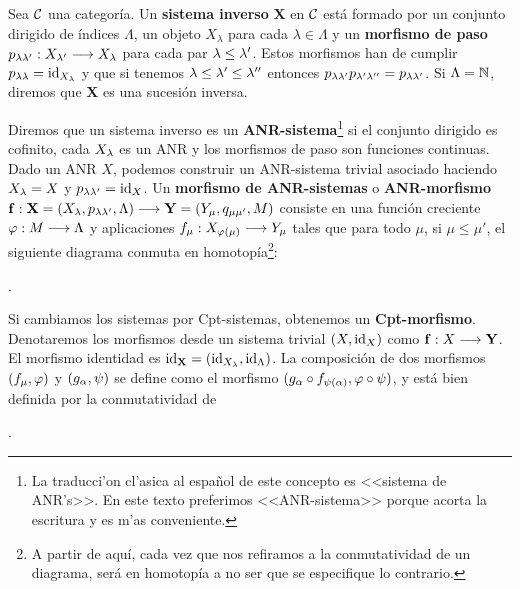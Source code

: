\begin{definition}
  Sea $ \mathcal{C}  $ una categoría. Un \textbf{sistema inverso} $ \mathbf{X } $ en $ \mathcal{C}  $ está formado por un conjunto dirigido de índices $ \Lambda  $, un objeto $ X_\lambda  $ para cada $ \lambda \in \Lambda  $ y un \textbf{morfismo de paso} $ p_{\lambda \lambda' } : X_{\lambda'} \longrightarrow X_\lambda $ para cada par $ \lambda\leq \lambda'  $. Estos morfismos han de cumplir $ p_{\lambda \lambda }  = \operatorname{id}_{X_\lambda } $ y que si tenemos $ \lambda\leq \lambda' \leq \lambda''  $ entonces $ p_{\lambda \lambda'}p_{\lambda'\lambda ''} = p_{\lambda \lambda' } $. Si $ \Lambda  = \mathbb{N}  $, diremos que $ \mathbf{X } $ es una sucesión inversa.
\end{definition}

Diremos que un sistema inverso es un \textbf{ANR-sistema}\footnote{La traducci'on cl'asica al espa\~nol de este concepto es <<sistema de ANR's>>. En este texto preferimos <<ANR-sistema>> porque acorta la escritura y es m'as conveniente.} si el conjunto dirigido es cofinito, cada $ X_\lambda  $ es un ANR y los morfismos de paso son funciones continuas. Dado un ANR $ X  $, podemos construir un ANR-sistema trivial asociado haciendo $ X_\lambda = X  $ y $ p_{\lambda\lambda'} = \operatorname{id}_X  $. Un \textbf{morfismo de ANR-sistemas} o \textbf{ANR-morfismo} $ \mathbf{f}:\mathbf{X} = (X_\lambda,p_{\lambda\lambda'},\Lambda)\longrightarrow \mathbf{Y} = (Y_\mu,q_{\mu\mu'},M )  $ consiste en una función creciente $ \varphi:M \longrightarrow \Lambda  $ y aplicaciones $ f_\mu :X_{\varphi(\mu)}\longrightarrow Y_\mu  $ tales que para todo $ \mu $, si $ \mu\leq \mu'  $, el siguiente diagrama conmuta en homotopía\footnote{A partir de aquí, cada vez que nos refiramos a la conmutatividad de un diagrama, será en homotopía a no ser que se especifique lo contrario.}:
\begin{center}
  .
\end{center}
 Si cambiamos los sistemas por Cpt-sistemas, obtenemos un \textbf{Cpt-morfismo}. Denotaremos los morfismos desde un sistema trivial $(X,\operatorname{id}_X) $ como $\mathbf{f}:X\longrightarrow \mathbf{Y}$. El morfismo identidad es $ \mathbf{\operatorname{id}_\mathbf{X}} = (\operatorname{id}_{X_\lambda},\operatorname{id}_\Lambda) $. La composición de dos morfismos $ (f_\mu, \varphi ) $ y $ (g_\alpha, \psi ) $ se define como el morfismo $ (g_\alpha\circ f_{\psi(\alpha )}, \varphi\circ \psi ) $, y está bien definida por la conmutatividad de
\begin{center}
  .
\end{center}

